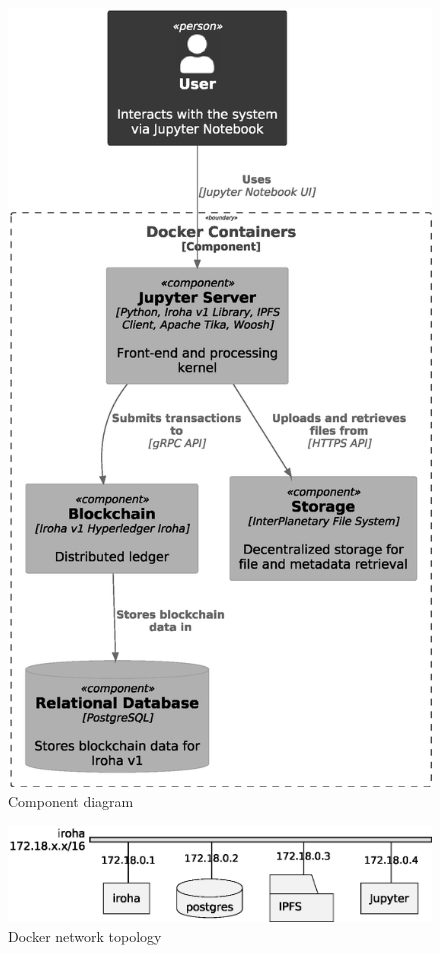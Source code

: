 \documentclass[final]{rc-book-2.14}
\begin{document}
\begin{figure}[htbp]
    \centering
    \includegraphics[scale=0.4]{fig/c4_component_diagram.eps}
    \caption{Component diagram}
    \label{fig:c4_component_diagram}
\end{figure}


\begin{figure}[htbp]
    \centering
    \includegraphics[scale=0.5]{fig/network_topology.eps}
    \caption{Docker network topology}
    \label{fig:docker_ntw_topology}
\end{figure}
\end{document}
